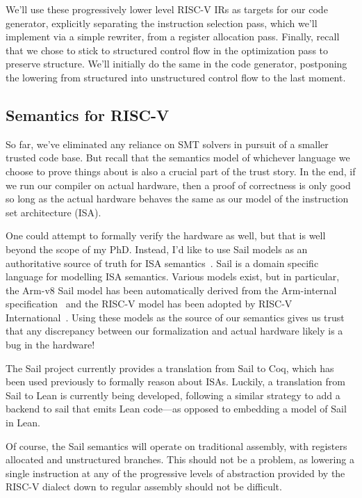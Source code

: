 \documentclass[a4paper]{scrartcl}
\begin{document}
We'll use these progressively lower level RISC-V IRs as targets for our code
generator, explicitly separating the instruction selection pass, which
we'll implement via a simple rewriter, from a register allocation pass.
Finally, recall that we chose to stick to structured control flow in the
optimization pass to preserve structure. We'll initially do the same in the code
generator, postponing the lowering from structured into unstructured
control flow to the last moment. 

\subsection{Semantics for RISC-V}

So far, we've eliminated any reliance on SMT solvers in pursuit of a
smaller trusted code base. But recall that the semantics model of
whichever language we choose to prove things about is also a crucial
part of the trust story. In the end, if we run our compiler on actual
hardware, then a proof of correctness is only good so long as the actual
hardware behaves the same as our model of the instruction set
architecture (ISA).

One could attempt to formally verify the hardware as well, but that is
well beyond the scope of my PhD. Instead, I'd like to use Sail models as
an authoritative source of truth for ISA semantics~\cite{armstrongISASemanticsARMv8a2019}.
Sail is a domain specific
language for modelling ISA semantics. Various models exist, but in
particular, the Arm-v8 Sail model has been automatically derived from the Arm-internal 
specification~\cite{reidTrustworthySpecificationsARM} and the RISC-V model has
been adopted by RISC-V International~\cite{sammlerIslarisVerificationMachine2022}. 
Using these models as the source of our semantics gives us trust that any discrepancy
between our formalization and actual hardware likely is a bug in the
hardware!

The Sail project currently provides a translation from Sail to Coq,
which has been used previously to formally reason about ISAs. Luckily, a
translation from Sail to Lean is currently being developed, following a
similar strategy to add a backend to sail that emits Lean code---as
opposed to embedding a model of Sail in Lean.

Of course, the Sail semantics will operate on traditional assembly, with
registers allocated and unstructured branches. This should not be a
problem, as lowering a single instruction at any of the progressive
levels of abstraction provided by the RISC-V dialect down to regular 
assembly should not be difficult.
\end{document}
